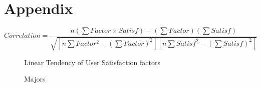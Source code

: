 \documentclass[12pt]{article}
\begin{document}
\newpage 
\section*{Appendix}


  \begin{equation}\label{correlation}
   Correlation = \frac{n(\sum Factor\times Satisf) - (\sum Factor)(\sum Satisf)}{\sqrt{[n\sum Factor^2 - (\sum Factor)^2][n\sum Satisf^2 - (\sum Satisf)^2]}}
  \end{equation}




\begin{figure}[bht]
	\begin{center}
	{}
	\end{center}
	\vspace{-5mm} %
\caption{Linear Tendency of User Satisfaction factors}
	\label{linear tendency}
	\end{figure}


\begin{figure}[bht]
	\begin{center}
	{}
	\end{center}
	\vspace{-5mm} %
\caption{Majors}
	\label{majors}
	\end{figure}
\end{document}
